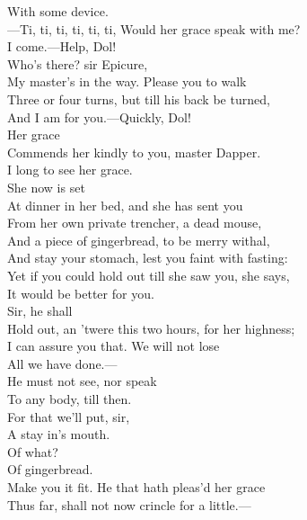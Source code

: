 \documentclass[a4paper,oneside]{memoir}
\begin{document}
\begin{drama*}
With some device.\\
---Ti, ti, ti, ti, ti, ti, Would her grace speak with me?\\
I come.---Help, Dol!\\
\facespeaks {} Who's there? sir Epicure,\\
My master's in the way. Please you to walk\\
Three or four turns, but till his back be turned,\\
And I am for you.---Quickly, Dol!\\
\subtlespeaks {} Her grace\\
Commends her kindly to you, master Dapper.\\
\dapperspeaks I long to see her grace.\\
\subtlespeaks {} She now is set\\
At dinner in her bed, and she has sent you\\
From her own private trencher, a dead mouse,\\
And a piece of gingerbread, to be merry withal,\\
And stay your stomach, lest you faint with fasting:\\
Yet if you could hold out till she saw you, she says,\\
It would be better for you.\\
\facespeaks {} Sir, he shall\\
Hold out, an 'twere this two hours, for her highness;\\
I can assure you that. We will not lose\\
All we have done.---\\
\subtlespeaks {} He must not see, nor speak\\
To any body, till then.\\
\facespeaks {} For that we'll put, sir,\\
A stay in's mouth.\\
\subtlespeaks {} Of what?\\
\facespeaks {} Of gingerbread.\\
Make you it fit. He that hath pleas'd her grace\\
Thus far, shall not now crincle for a little.---\\

\end{drama*}
\end{document}
